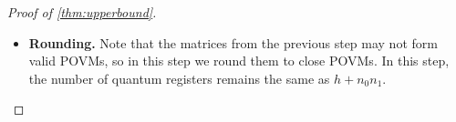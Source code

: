 \documentclass[10pt,a4paper]{article}
\def\H{\CMcal{H}}
\theoremstyle{plain}
\theoremstyle{definition}
\newcommand {\minusspace} {\: \! \!}
\newcommand {\Fn} [2] {\ensuremath{ #1 \minusspace \Br{ #2 } }}
\newcommand {\set} [1] {\ensuremath{ \left\lbrace #1 \right\rbrace }}
\newcommand {\br} [1] {\ensuremath{ \left( #1 \right) }}
\newcommand {\Br} [1] {\ensuremath{ \left[ #1 \right] }}
\newcommand {\ab} [1] {\ensuremath{ \left| #1 \right| }}
\DeclareMathOperator*{\bigE}{\mathbb{E}}
\newcommand {\expec} [2] {\Fn{\bigE_{\substack{#1}}}{#2}}
\newcommand{\nnorm}[1]{{\left\vert\kern-0.25ex\left\vert\kern-0.25ex\left\vert #1
		\right\vert\kern-0.25ex\right\vert\kern-0.25ex\right\vert}}
\newcommand {\Tr} {\ensuremath{ \mathrm{Tr} }}
\newcommand {\id} {\ensuremath{\mathds{1}}}
\newcommand{\randx}{\ensuremath{\mathbf{x}}}
\newcommand{\randy}{\ensuremath{\mathbf{y}}}
\newcommand{\herspace}[1]{\ensuremath{\H_m^{\otimes #1}}}
\newcommand{\gval}[3]{\ensuremath{\mathrm{val}_{#1}\br{\set{#2},\set{#3}}}}
\newcommand{\fourtuples}{\ensuremath{\br{x,y,a,b}\in\calX\times\calY\times\calA\times\calB}}
\newcommand{\Pnn}[1] {\ensuremath{{P^{\,x, (#1)}_a}}}
\newcommand{\Qnn}[1] {\ensuremath{{Q^{\,y, (#1)}_b}}}
\newcommand{\calX}{\mathcal{X}}
\newcommand{\calY}{\mathcal{Y}}
\newcommand{\calA}{\mathcal{A}}
\newcommand{\calB}{\mathcal{B}}
\newcommand{\1}{\mathbb{1}} %
\begin{document}
\begin{proof}[Proof of \cref{thm:upperbound}]
\begin{itemize}
For any \fourtuples, applying \cite[Lemma 10.11]{qin2021nonlocal} to $\Pnn{5}(\randx)$, $\Qnn{5}(\randy)$ with $n\gets n_0n_1$, $h\gets h$, $d\gets 2d$, $\tau\gets\tau$ to get $\Pnn{6},\Qnn{6}\in\herspace{h+n_0n_1}$ satisfying the following.
      
   \begin{enumerate}
		\item For any $x,y,a,b$, $\displaystyle\nnorm{\Pnn{6}}_2^2\leq2$ and 		
		$\displaystyle\nnorm{\Qnn{6}}_2^2\leq2.$
		\item $\gval{h+n_0n_1}{\Pnn{6}}{\Qnn{6}}=\expec{\randx,\randy}{\gval{h}{\Pnn{5}(\randx)}{\Qnn{5}(\randy)}}.$
		\item $\displaystyle\sum_{x,a}\mu_A(x)\ab{\frac{1}{m^{h+n_0n_1}}\Tr~\zeta\br{\Pnn{6}}-\frac{1}{m^h}\expec{}{\Tr~\zeta\br{\Pnn{5}(\randx)}}}\leq O\br{t\br{9^dm^{d}\sqrt{\tau}d}^{2/3}}$ and

$\displaystyle\sum_{y,b}\mu_B(y)\ab{\frac{1}{m^{h+n_0n_1}}\Tr~\zeta\br{\Qnn{6}}-\frac{1}{m^h}\expec{}{\Tr~\zeta\br{{\Qnn{5}(\randy)}}}}\leq O\br{t\br{9^dm^{d}\sqrt{\tau}d}^{2/3}}$.
\item For any $x,y$, $\sum_{a\in\calA}\Pnn{6}=\sum_{b\in\calB}\Qnn{6}=\id.$
	\end{enumerate}

\item \textbf{Rounding.} Note that the matrices from the previous step may not form valid POVMs, so in this step we round them to close POVMs. In this step, the number of quantum registers remains the same as $h+n_0n_1$.


\end{itemize}
\end{proof}
\end{document}
